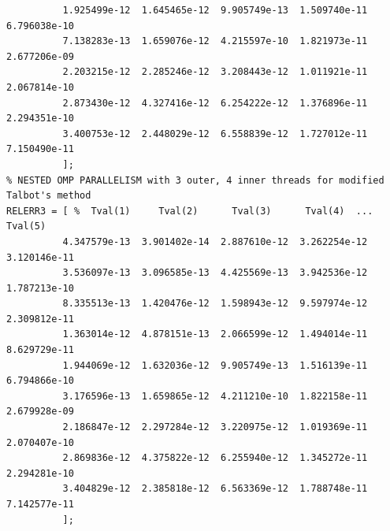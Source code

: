 \documentclass[a4paper,10pt]{report}%
\begin{document}
\begin{lstlisting}
          1.925499e-12  1.645465e-12  9.905749e-13  1.509740e-11  6.796038e-10
          7.138283e-13  1.659076e-12  4.215597e-10  1.821973e-11  2.677206e-09
          2.203215e-12  2.285246e-12  3.208443e-12  1.011921e-11  2.067814e-10
          2.873430e-12  4.327416e-12  6.254222e-12  1.376896e-11  2.294351e-10
          3.400753e-12  2.448029e-12  6.558839e-12  1.727012e-11  7.150490e-11
          ];
% NESTED OMP PARALLELISM with 3 outer, 4 inner threads for modified Talbot's method
RELERR3 = [ %  Tval(1)     Tval(2)      Tval(3)      Tval(4)  ... Tval(5)
          4.347579e-13  3.901402e-14  2.887610e-12  3.262254e-12  3.120146e-11
          3.536097e-13  3.096585e-13  4.425569e-13  3.942536e-12  1.787213e-10
          8.335513e-13  1.420476e-12  1.598943e-12  9.597974e-12  2.309812e-11
          1.363014e-12  4.878151e-13  2.066599e-12  1.494014e-11  8.629729e-11
          1.944069e-12  1.632036e-12  9.905749e-13  1.516139e-11  6.794866e-10
          3.176596e-13  1.659865e-12  4.211210e-10  1.822158e-11  2.679928e-09
          2.186847e-12  2.297284e-12  3.220975e-12  1.019369e-11  2.070407e-10
          2.869836e-12  4.375822e-12  6.255940e-12  1.345272e-11  2.294281e-10
          3.404829e-12  2.385818e-12  6.563369e-12  1.788748e-11  7.142577e-11
          ];
\end{lstlisting}
\end{document}
